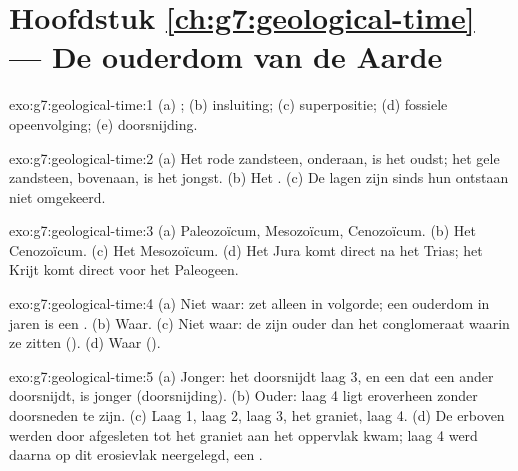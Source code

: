 \section*{Hoofdstuk \ref{ch:g7:geological-time} --- De ouderdom van de Aarde}

\begin{solution}{exo:g7:geological-time:1}
(a) ; (b) insluiting; (c) superpositie; (d) fossiele
opeenvolging; (e) doorsnijding.
\end{solution}

\begin{solution}{exo:g7:geological-time:2}
(a) Het rode zandsteen, onderaan, is het oudst; het gele zandsteen,
bovenaan, is het jongst. (b) Het . (c) De lagen
zijn sinds hun ontstaan niet omgekeerd.
\end{solution}

\begin{solution}{exo:g7:geological-time:3}
(a) Paleozoïcum, Mesozoïcum, Cenozoïcum. (b) Het Cenozoïcum. (c) Het
Mesozoïcum. (d) Het Jura komt direct na het Trias; het Krijt komt direct
voor het Paleogeen.
\end{solution}

\begin{solution}{exo:g7:geological-time:4}
(a) Niet waar:  zet  alleen in volgorde; een
ouderdom in jaren is een . (b) Waar. (c) Niet waar: de
 zijn ouder dan het conglomeraat waarin ze zitten (). (d) Waar ().
\end{solution}

\begin{solution}{exo:g7:geological-time:5}
(a) Jonger: het doorsnijdt laag 3, en een  dat een ander
doorsnijdt, is jonger (doorsnijding). (b) Ouder: laag 4 ligt eroverheen
zonder doorsneden te zijn. (c) Laag 1, laag 2, laag 3, het graniet,
laag 4. (d) De  erboven werden door  afgesleten tot het
graniet aan het oppervlak kwam; laag 4 werd daarna op dit erosievlak
neergelegd, een .
\end{solution}

